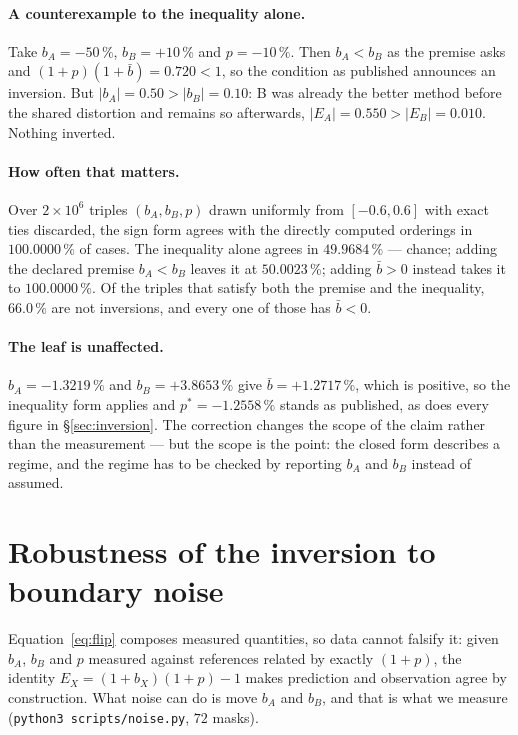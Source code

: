 \documentclass{article}
\newcommand{\pct}[1]{$#1\,\%$}
\begin{document}
\paragraph{A counterexample to the inequality alone.} Take $b_A = -50\,\%$, $b_B = +10\,\%$ and
$p = -10\,\%$. Then $b_A < b_B$ as the premise asks and $(1+p)(1+\bar b) = 0.720 < 1$, so the
condition as published announces an inversion. But $|b_A| = 0.50 > |b_B| = 0.10$: B was already the
better method before the shared distortion and remains so afterwards,
$|E_A| = 0.550 > |E_B| = 0.010$. Nothing inverted.

\paragraph{How often that matters.} Over $2\times10^6$ triples $(b_A,b_B,p)$ drawn uniformly from
$[-0.6,0.6]$ with exact ties discarded, the sign form agrees with the directly computed orderings
in \pct{100.0000} of cases. The inequality alone agrees in \pct{49.9684} --- chance; adding the
declared premise $b_A<b_B$ leaves it at \pct{50.0023}; adding $\bar b > 0$ instead takes it to
\pct{100.0000}. Of the triples that satisfy both the premise and the inequality, \pct{66.0} are not
inversions, and every one of those has $\bar b < 0$.

\paragraph{The leaf is unaffected.} $b_A = -1.3219\,\%$ and $b_B = +3.8653\,\%$ give
$\bar b = +1.2717\,\%$, which is positive, so the inequality form applies and
$p^{*} = -1.2558\,\%$ stands as published, as does every figure in \S\ref{sec:inversion}. The
correction changes the scope of the claim rather than the measurement --- but the scope is the
point: the closed form describes a regime, and the regime has to be checked by reporting $b_A$ and
$b_B$ instead of assumed.

\section{Robustness of the inversion to boundary noise}
\label{app:noise}

Equation~\eqref{eq:flip} composes measured quantities, so data cannot falsify it: given $b_A$,
$b_B$ and $p$ measured against references related by exactly $(1+p)$, the identity
$E_X = (1+b_X)(1+p)-1$ makes prediction and observation agree by construction. What noise can do is
move $b_A$ and $b_B$, and that is what we measure
(\texttt{python3 scripts/noise.py}, $72$ masks).
\end{document}
